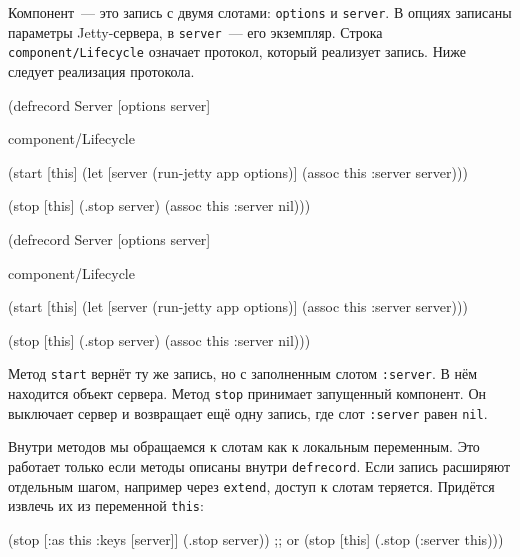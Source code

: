 \fi

Компонент~--- это запись с двумя слотами: \verb|options| и \verb|server|. В
опциях записаны параметры Jetty-сервера, в \verb|server|~--- его
экземпляр. Строка \verb|component/Lifecycle| означает протокол, который
реализует запись. Ниже следует реализация протокола.

\ifx\DEVICETYPE\MOBILE

\begin{english}
  \begin{clojure}
(defrecord Server [options server]

  component/Lifecycle

  (start [this]
    (let [server (run-jetty app
                   options)]
      (assoc this :server server)))

  (stop [this]
    (.stop server)
    (assoc this :server nil)))
  \end{clojure}
\end{english}

\else

\begin{english}
  \begin{clojure}
(defrecord Server [options server]

  component/Lifecycle

  (start [this]
    (let [server (run-jetty app options)]
      (assoc this :server server)))

  (stop [this]
    (.stop server)
    (assoc this :server nil)))
  \end{clojure}
\end{english}
\fi


Метод \verb|start| вернёт ту же запись, но с заполненным слотом
\verb|:server|. В нём находится объект сервера. Метод \verb|stop| принимает
запущенный компонент. Он выключает сервер и возвращает ещё одну запись, где слот
\verb|:server| равен \verb|nil|.


Внутри методов мы обращаемся к слотам как к локальным переменным. Это работает
только если методы описаны внутри \verb|defrecord|. Если запись расширяют
отдельным шагом, например через \verb|extend|, доступ к слотам
теряется. Придётся извлечь их из переменной \verb|this|:

\begin{english}
  \begin{clojure}
(stop [{:as this :keys [server]}]
  (.stop server))
;; or
(stop [this]
  (.stop (:server this)))
  \end{clojure}
\end{english}

